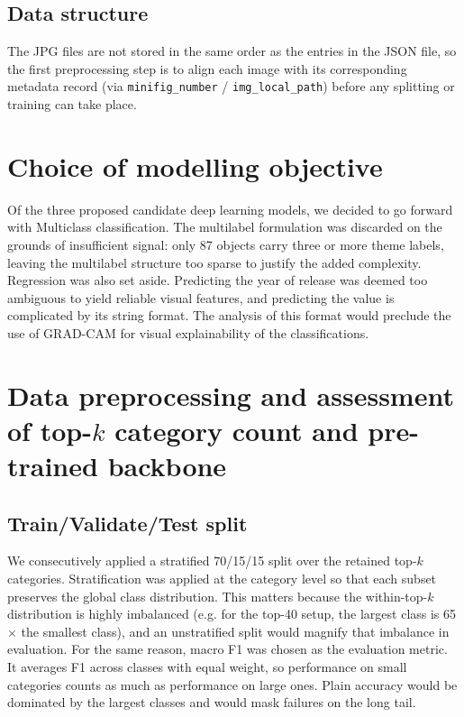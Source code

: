 \subsection{Data structure}
The JPG files are not stored in the same order as the entries in the JSON file, so the first preprocessing step is to align each image with its corresponding metadata record (via \texttt{minifig\_number} / \texttt{img\_local\_path}) before any splitting or training can take place.

\section{Choice of modelling objective}
Of the three proposed candidate deep learning models, we decided to go forward with Multiclass classification. The multilabel formulation was discarded on the grounds of insufficient signal: only 87 objects carry three or more theme labels, leaving the multilabel structure too sparse to justify the added complexity. Regression was also set aside. Predicting the year of release was deemed too ambiguous to yield reliable visual features, and predicting the value is complicated by its string format. The analysis of this format would preclude the use of GRAD-CAM for visual explainability of the classifications. 

\section{Data preprocessing and assessment of top-$k$ category count and pre-trained backbone}
\subsection{Train/Validate/Test split}
We consecutively applied a stratified 70/15/15 split over the retained top-$k$ categories. Stratification was applied at the category level so that each subset preserves the global class distribution. This matters because the within-top-$k$ distribution is highly imbalanced (e.g. for the top-40 setup, the largest class is 65$\times$ the smallest class), and an unstratified split would magnify that imbalance in evaluation.
For the same reason, macro F1 was chosen as the evaluation metric. It averages F1 across classes with equal weight, so performance on small categories counts as much as performance on large ones. Plain accuracy would be dominated by the largest classes and would mask failures on the long tail.

